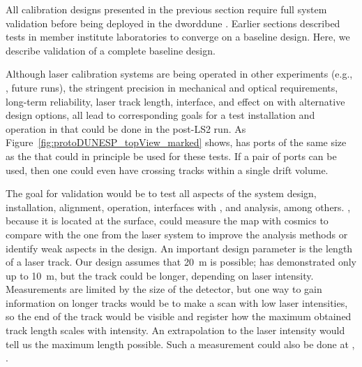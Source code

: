 

All calibration designs presented in the previous section require full system validation before being deployed in the dword{dune} . Earlier sections described tests in member institute laboratories 
to converge on a baseline design. Here, we describe validation of a complete baseline design.

Although laser calibration systems are being operated
in other  experiments (e.g., , future  runs), the stringent precision 
in mechanical and optical requirements, long-term reliability, laser track length,  interface, and effect on \efield with alternative design options, all lead to corresponding goals for a test installation and operation in  that could be done in the post-LS2 run. As Figure~\ref{fig:protoDUNESP_topView_marked} shows,  has ports of the same size as the   that could 
in principle be used for these tests. If a pair of ports can be used, then one could even have crossing tracks within a single drift volume. 

The goal for validation would be to test all aspects of the system design, installation, alignment, operation, interfaces with , and analysis, among others. , because it is located at the surface, could measure the \efield map with cosmics to compare with the one from the laser system to improve the analysis methods or identify weak aspects in the design. An important design parameter is the length of a laser track. Our design assumes that \SI{20}{\m} is possible;  has demonstrated only up to \SI{10}{\m}, but the track could be longer, depending on laser intensity. Measurements are limited by the size of the detector, but one way to gain information on longer tracks would be to make a scan with low laser intensities, so the end of the track would be visible and register how the maximum obtained track length scales with intensity. An extrapolation to the   laser intensity would tell us the maximum length possible. Such a measurement could also be done at , .


